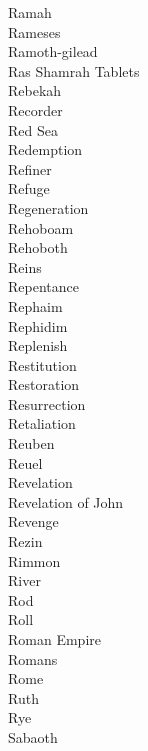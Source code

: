 Ramah  \\
Rameses  \\
Ramoth-gilead  \\
Ras Shamrah Tablets  \\
Rebekah  \\
Recorder  \\
Red Sea  \\
Redemption  \\
Refiner  \\
Refuge  \\
Regeneration  \\
Rehoboam  \\
Rehoboth  \\
Reins  \\
Repentance  \\
Rephaim  \\
Rephidim  \\
Replenish  \\
Restitution  \\
Restoration  \\
Resurrection  \\
Retaliation  \\
Reuben  \\
Reuel  \\
Revelation  \\
Revelation of John  \\
Revenge  \\
Rezin  \\
Rimmon  \\
River  \\
Rod  \\
Roll  \\
Roman Empire  \\
Romans  \\
Rome  \\
Ruth  \\
Rye  \\
Sabaoth  \\
